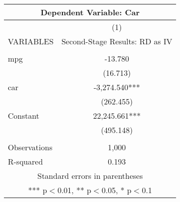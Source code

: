 \documentclass[]{article}
\begin{document}
\begin{tabular}{lc}
\multicolumn{2}{c}{Dependent Variable: Car} \\ \hline
 & (1) \\
VARIABLES & Second-Stage Results: RD as IV \\ \hline
 &  \\
mpg & -13.780 \\
 & (16.713) \\
car & -3,274.540*** \\
 & (262.455) \\
Constant & 22,245.661*** \\
 & (495.148) \\
 &  \\
Observations & 1,000 \\
 R-squared & 0.193 \\ \hline
\multicolumn{2}{c}{ Standard errors in parentheses} \\
\multicolumn{2}{c}{ *** p$<$0.01, ** p$<$0.05, * p$<$0.1} \\
\end{tabular}
\end{document}
